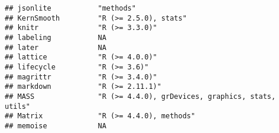 \documentclass[
]{article}
\begin{document}
\begin{verbatim}
## jsonlite           "methods"                                                                                                                                                                                             
## KernSmooth         "R (>= 2.5.0), stats"                                                                                                                                                                                 
## knitr              "R (>= 3.3.0)"                                                                                                                                                                                        
## labeling           NA                                                                                                                                                                                                    
## later              NA                                                                                                                                                                                                    
## lattice            "R (>= 4.0.0)"                                                                                                                                                                                        
## lifecycle          "R (>= 3.6)"                                                                                                                                                                                          
## magrittr           "R (>= 3.4.0)"                                                                                                                                                                                        
## markdown           "R (>= 2.11.1)"                                                                                                                                                                                       
## MASS               "R (>= 4.4.0), grDevices, graphics, stats, utils"                                                                                                                                                     
## Matrix             "R (>= 4.4.0), methods"                                                                                                                                                                               
## memoise            NA                                                                                                                                                                                                    

\end{verbatim}
\end{document}

